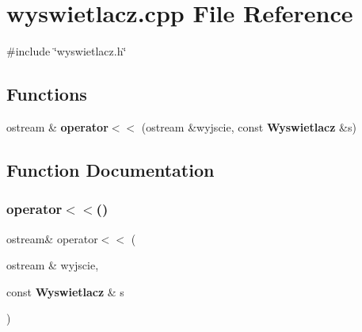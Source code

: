 \section{wyswietlacz.\+cpp File Reference}
\label{wyswietlacz_8cpp}
{\ttfamily \#include \char`\"{}wyswietlacz.\+h\char`\"{}}\newline
\subsection*{Functions}
\begin{DoxyCompactItemize}
\item 
ostream \& \textbf{ operator$<$$<$} (ostream \&wyjscie, const \textbf{ Wyswietlacz} \&s)
\end{DoxyCompactItemize}


\subsection{Function Documentation}
\mbox{\label{wyswietlacz_8cpp_ae6d943d6ec6cf596444b451cb978e07f}} 
\subsubsection{operator$<$$<$()}
{\footnotesize\ttfamily ostream\& operator$<$$<$ (\begin{DoxyParamCaption}\item[{ostream \&}]{wyjscie,  }\item[{const \textbf{ Wyswietlacz} \&}]{s }\end{DoxyParamCaption})}

